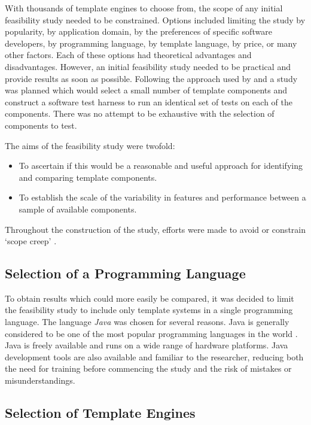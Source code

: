 With thousands of template engines to choose from, the scope of any initial feasibility study needed to be constrained. Options included limiting the study by popularity, by application domain, by the preferences of specific software developers, by programming language, by template language, by price, or many other factors. Each of these options had theoretical advantages and disadvantages. However, an initial feasibility study needed to be practical and provide results as soon as possible. Following the approach used by \citet{Laakso2008} and \citet{Zoio2005} a study was planned which would select a small number of template components and construct a software test harness to run an identical set of tests on each of the components. There was no attempt to be exhaustive with the selection of components to test.

The aims of the feasibility study were twofold:
\begin{itemize}
    \item To ascertain if this would be a reasonable and useful approach for identifying and comparing template components.
    \item To establish the scale of the variability in features and performance between a sample of available components.
\end{itemize}
Throughout the construction of the study, efforts were made to avoid or constrain `scope creep' \citep{Heinze2014}.

\subsection{Selection of a Programming Language}

To obtain results which could more easily be compared, it was decided to limit the feasibility study to include only template systems in a single programming language. The language \emph{Java} \citep{Oracle2018Java} was chosen for several reasons. Java is generally considered to be one of the most popular programming languages in the world \citep{Tiobe2018}. Java is freely available and runs on a wide range of hardware platforms. Java development tools are also available and familiar to the researcher, reducing both the need for training before commencing the study and the risk of mistakes or misunderstandings.

\subsection{Selection of Template Engines}

